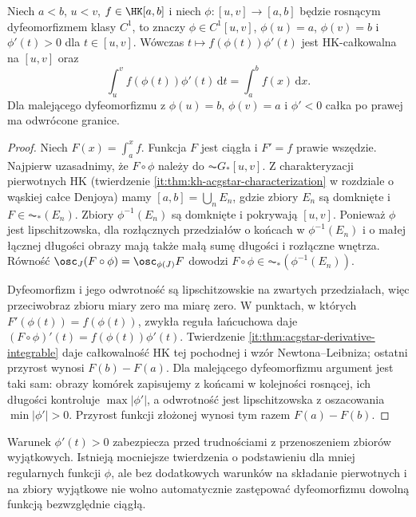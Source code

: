 \begin{twierdzenie}\label{ma1:kh:tw:hk-podstawienie}\label{tw:hk-podstawienie}
Niech $a<b$, $u<v$, $f\in\HK[a,b]$ i niech $\phi:[u,v]\to[a,b]$ będzie rosnącym dyfeomorfizmem klasy $C^1$, to znaczy $\phi\in C^1[u,v]$, $\phi(u)=a$, $\phi(v)=b$ i $\phi'(t)>0$ dla $t\in[u,v]$. Wówczas $t\mapsto f(\phi(t))\phi'(t)$ jest HK-całkowalna na $[u,v]$ oraz
\[
\int_u^v f(\phi(t))\phi'(t)\,\mathrm dt=\int_a^b f(x)\,\mathrm dx.
\]
Dla malejącego dyfeomorfizmu z $\phi(u)=b$, $\phi(v)=a$ i $\phi'<0$ całka po prawej ma odwrócone granice.
\end{twierdzenie}
\begin{proof}
Niech $F(x)=\int_a^x f$. Funkcja $F$ jest ciągła i $F'=f$ prawie wszędzie. Najpierw uzasadnimy, że $F\circ\phi$ należy do $\AC G_*[u,v]$. Z charakteryzacji pierwotnych HK (twierdzenie \ref{it:thm:kh-acgstar-characterization} w rozdziale o wąskiej całce Denjoya) mamy $[a,b]=\bigcup_n E_n$, gdzie zbiory $E_n$ są domknięte i $F\in\AC_*(E_n)$. Zbiory $\phi^{-1}(E_n)$ są domknięte i pokrywają $[u,v]$. Ponieważ $\phi$ jest lipschitzowska, dla rozłącznych przedziałów o końcach w $\phi^{-1}(E_n)$ i o małej łącznej długości obrazy mają także małą sumę długości i rozłączne wnętrza. Równość
$\osc_J(F\circ\phi)=\osc_{\phi(J)}F$ dowodzi $F\circ\phi\in\AC_*(\phi^{-1}(E_n))$.

Dyfeomorfizm i jego odwrotność są lipschitzowskie na zwartych przedziałach, więc przeciwobraz zbioru miary zero ma miarę zero. W punktach, w których $F'(\phi(t))=f(\phi(t))$, zwykła reguła łańcuchowa daje $(F\circ\phi)'(t)=f(\phi(t))\phi'(t)$. Twierdzenie \ref{it:thm:acgstar-derivative-integrable} daje całkowalność HK tej pochodnej i wzór Newtona--Leibniza; ostatni przyrost wynosi $F(b)-F(a)$. Dla malejącego dyfeomorfizmu argument jest taki sam: obrazy komórek zapisujemy z końcami w kolejności rosnącej, ich długości kontroluje $\max|\phi'|$, a odwrotność jest lipschitzowska z oszacowania $\min|\phi'|>0$. Przyrost funkcji złożonej wynosi tym razem $F(a)-F(b)$.
\end{proof}
\begin{uwaga}
Warunek $\phi'(t)>0$ zabezpiecza przed trudnościami z przenoszeniem zbiorów wyjątkowych. Istnieją mocniejsze twierdzenia o podstawieniu dla mniej regularnych funkcji $\phi$, ale bez dodatkowych warunków na składanie pierwotnych i na zbiory wyjątkowe nie wolno automatycznie zastępować dyfeomorfizmu dowolną funkcją bezwzględnie ciągłą.
\end{uwaga}
